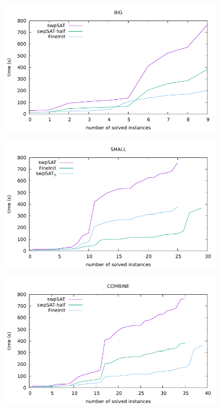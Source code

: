 \documentclass[12pt,a4paper,twoside]{scrartcl}
\numberwithin{equation}{section}
\begin{document}
 \begin{figure}[H]
\begin{center}
  \includegraphics[scale = 1]{DATA/BIG/a4.pdf}
  \end{center}
  \caption{}
  \label{Experiment 11 k5 cactus plot}
  \end{figure}
  \begin{figure}[H]
\begin{center}
  \includegraphics[scale = 1]{DATA/SMALL/a4.pdf}
  \end{center}
  \caption{}
  \label{Experiment 11 k7 cactus plot}
  \end{figure} 
  \begin{figure}[H]
\begin{center}
  \includegraphics[scale = 1]{DATA/COMBINE/a4.pdf}
  \end{center}
  \caption{}
  \label{Experiment 11 all cactus plot}
  \end{figure} 
\end{document}
